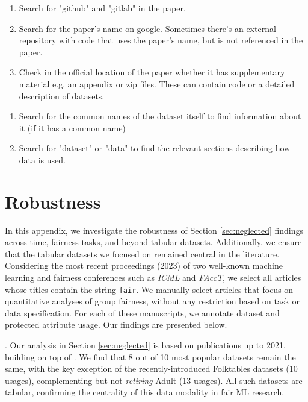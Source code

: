 
\begin{enumerate}
    \item Search for "github" and "gitlab" in the paper.
    \item Search for the paper's name on google.
        Sometimes there's an external repository with code that uses the paper's name, but is not referenced in the paper.
    \item Check in the official location of the paper whether it has supplementary material e.g. an appendix or zip files. These can contain code or a detailed description of datasets.
\end{enumerate}
\begin{enumerate}
    \item Search for the common names of the dataset itself to find information about it (if it has a common name)
    \item Search for "dataset" or "data" to find the relevant sections describing how data is used.
\end{enumerate}

\section{Robustness}\label{app:robustness}
In this appendix, we investigate the robustness of Section \ref{sec:neglected} findings across time, fairness tasks, and beyond tabular datasets. Additionally, we ensure that the tabular datasets we focused on remained central in the literature. Considering the most recent proceedings (2023) of two well-known machine learning and fairness conferences such as \emph{ICML} and \emph{FAccT}, we select all articles whose titles contain the string \texttt{fair}. We manually select articles that focus on quantitative analyses of group fairness, without any restriction based on task or data specification. For each of these manuscripts, we annotate dataset and protected attribute usage. Our findings are presented below.

. Our analysis in Section \ref{sec:neglected} is based on publications up to 2021, building on top of \citet{fabris2022algorithmic}. We find that 8 out of 10 most popular datasets remain the same, with the key exception of the recently-introduced Folktables datasets \citep{ding2021retiring} (10 usages), complementing but not \emph{retiring} Adult (13 usages). All such datasets are tabular, confirming the centrality of this data modality in fair ML research.

